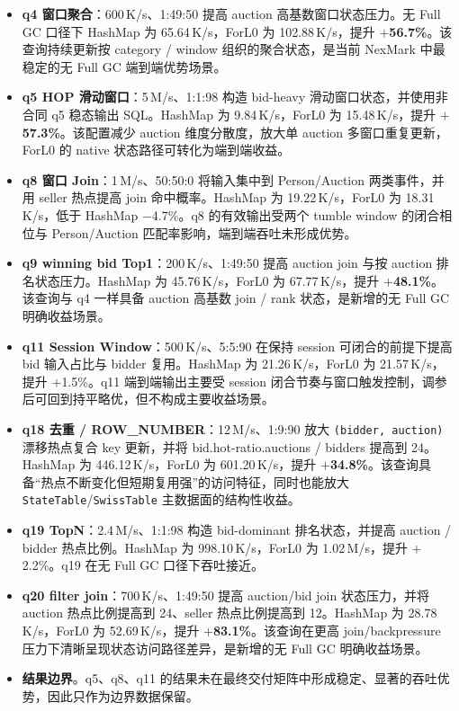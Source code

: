 \documentclass[a4paper,11pt]{article}
\begin{document}
\begin{itemize}
  \item \textbf{q4 窗口聚合}：600\,K/s、1:49:50 提高 auction 高基数窗口状态压力。无 Full GC 口径下 HashMap 为 65.64\,K/s，ForL0 为 102.88\,K/s，提升 \textbf{$+$56.7\%}。该查询持续更新按 category / window 组织的聚合状态，是当前 NexMark 中最稳定的无 Full GC 端到端优势场景。
  \item \textbf{q5 HOP 滑动窗口}：5\,M/s、1:1:98 构造 bid-heavy 滑动窗口状态，并使用非合同 q5 稳态输出 SQL。HashMap 为 9.84\,K/s，ForL0 为 15.48\,K/s，提升 \textbf{$+$57.3\%}。该配置减少 auction 维度分散度，放大单 auction 多窗口重复更新，ForL0 的 native 状态路径可转化为端到端收益。
  \item \textbf{q8 窗口 Join}：1\,M/s、50:50:0 将输入集中到 Person/Auction 两类事件，并用 seller 热点提高 join 命中概率。HashMap 为 19.22\,K/s，ForL0 为 18.31\,K/s，低于 HashMap $-$4.7\%。q8 的有效输出受两个 tumble window 的闭合相位与 Person/Auction 匹配率影响，端到端吞吐未形成优势。
  \item \textbf{q9 winning bid Top1}：200\,K/s、1:49:50 提高 auction join 与按 auction 排名状态压力。HashMap 为 45.76\,K/s，ForL0 为 67.77\,K/s，提升 \textbf{$+$48.1\%}。该查询与 q4 一样具备 auction 高基数 join / rank 状态，是新增的无 Full GC 明确收益场景。
  \item \textbf{q11 Session Window}：500\,K/s、5:5:90 在保持 session 可闭合的前提下提高 bid 输入占比与 bidder 复用。HashMap 为 21.26\,K/s，ForL0 为 21.57\,K/s，提升 $+$1.5\%。q11 端到端输出主要受 session 闭合节奏与窗口触发控制，调参后可回到持平略优，但不构成主要收益场景。
  \item \textbf{q18 去重 / ROW\_NUMBER}：12\,M/s、1:9:90 放大 \texttt{(bidder, auction)} 漂移热点复合 key 更新，并将 bid.hot-ratio.auctions / bidders 提高到 24。HashMap 为 446.12\,K/s，ForL0 为 601.20\,K/s，提升 \textbf{$+$34.8\%}。该查询具备“热点不断变化但短期复用强”的访问特征，同时也能放大 \texttt{StateTable}/\texttt{SwissTable} 主数据面的结构性收益。
  \item \textbf{q19 TopN}：2.4\,M/s、1:1:98 构造 bid-dominant 排名状态，并提高 auction / bidder 热点比例。HashMap 为 998.10\,K/s，ForL0 为 1.02\,M/s，提升 $+$2.2\%。q19 在无 Full GC 口径下吞吐接近。
  \item \textbf{q20 filter join}：700\,K/s、1:49:50 提高 auction/bid join 状态压力，并将 auction 热点比例提高到 24、seller 热点比例提高到 12。HashMap 为 28.78\,K/s，ForL0 为 52.69\,K/s，提升 \textbf{$+$83.1\%}。该查询在更高 join/backpressure 压力下清晰呈现状态访问路径差异，是新增的无 Full GC 明确收益场景。
  \item \textbf{结果边界}。q5、q8、q11 的结果未在最终交付矩阵中形成稳定、显著的吞吐优势，因此只作为边界数据保留。
\end{itemize}
\end{document}
